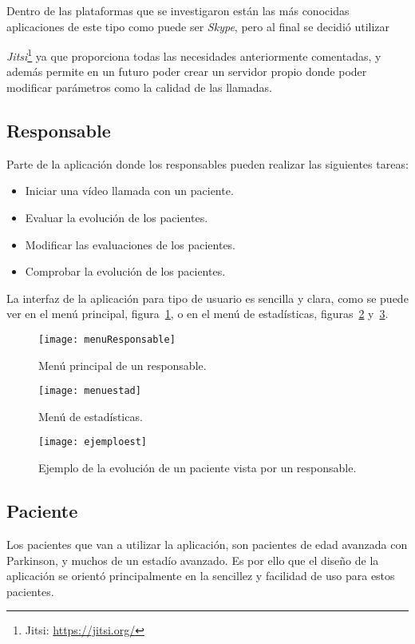 Dentro de las plataformas que se investigaron están las más conocidas aplicaciones de este tipo como puede ser \textit{Skype}, pero al final se decidió utilizar {\textit{Jitsi}\footnote{Jitsi: \url{https://jitsi.org/}} ya que proporciona todas las necesidades anteriormente comentadas, y además permite en un futuro poder crear un servidor propio donde poder modificar parámetros como la calidad de las llamadas.

\subsection{Responsable}
Parte de la aplicación donde los responsables pueden realizar las siguientes tareas:
\begin{itemize}
	\item Iniciar una vídeo llamada con un paciente.
	\item Evaluar la evolución de los pacientes.
	\item Modificar las evaluaciones de los pacientes.
	\item Comprobar la evolución de los pacientes.
\end{itemize}

La interfaz de la aplicación para tipo de usuario es sencilla y clara, como se puede ver en el menú principal, figura~\ref{fig:menuPaciente}, o en el menú de estadísticas, figuras~\ref{fig:menuest} y~\ref{fig:ejemploest}.

\begin{figure}[h]
	\centering
	\texttt{[image: menuResponsable]}
	\caption{Menú principal de un responsable.}
	\label{fig:menuPaciente}
\end{figure}

\begin{figure}[h]
	\centering
	\texttt{[image: menuestad]}
	\caption{Menú de estadísticas.}
	\label{fig:menuest}
\end{figure}

\begin{figure}[h]
	\centering
	\texttt{[image: ejemploest]}
	\caption{Ejemplo de la evolución de un paciente vista por un responsable.}
	\label{fig:ejemploest}
\end{figure}

\subsection{Paciente}
Los pacientes que van a utilizar la aplicación, son pacientes de edad avanzada con Parkinson, y muchos de un estadío avanzado. Es por ello que el diseño de la aplicación se orientó principalmente en la sencillez y facilidad de uso para estos pacientes.

}
